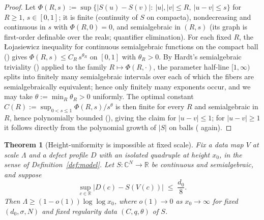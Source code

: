 \documentclass[11pt]{amsart}
\newtheorem{theorem}{Theorem}[section]
\theoremstyle{definition}
\theoremstyle{remark}
\newcommand{\CC}{\mathbb{C}}
\newcommand{\RR}{\mathbb{R}}
\begin{document}
\begin{proof}
Let $\Phi(R,s):=\sup\{|S(u)-S(v)|:\ |u|,|v|\le R,\ |u-v|\le s\}$ for $R\ge1$, $s\in[0,1]$; it is finite (continuity of $S$ on compacta), nondecreasing and continuous in $s$ with $\Phi(R,0)=0$, and semialgebraic in $(R,s)$ (its graph is first-order definable over the reals; quantifier elimination). For each fixed $R$, the \L ojasiewicz inequality for continuous semialgebraic functions on the compact ball (\cite[Prop.~2.6.4]{BCR}) gives $\Phi(R,s)\le C_R\,s^{\theta_R}$ on $[0,1]$ with $\theta_R>0$. By Hardt's semialgebraic triviality (\cite[Thm.~9.3.2]{BCR}) applied to the family $R\mapsto\Phi(R,\cdot)$, the parameter half-line $[1,\infty)$ splits into finitely many semialgebraic intervals over each of which the fibers are semialgebraically equivalent; hence only finitely many exponents occur, and we may take $\theta:=\min_R\theta_R>0$ uniformly. The optimal constant $C(R):=\sup_{0<s\le1}\Phi(R,s)/s^{\theta}$ is then finite for every $R$ and semialgebraic in $R$, hence polynomially bounded (\cite[Prop.~2.6.2]{BCR}), giving the claim for $|u-v|\le1$; for $|u-v|\ge1$ it follows directly from the polynomial growth of $|S|$ on balls (\cite[Prop.~2.6.2]{BCR} again).
\end{proof}

\begin{theorem}[Height-uniformity is impossible at fixed scale]\label{thm:lower}
Fix a data map $V$ at scale $\Lambda$ and a defect profile $D$ with an isolated quadruple at height $x_0$, in the sense of Definition~\ref{def:model}. Let $S:\CC^N\to\RR$ be continuous and semialgebraic, and suppose
\[
\sup_{c\in\RR}\big|D(c)-S(V(c))\big|\;\le\;\frac{d_0}{8}.
\]
Then $\Lambda\ge(1-o(1))\log\log x_0$, where $o(1)\to0$ as $x_0\to\infty$ for fixed $(d_0,\sigma,N)$ and fixed regularity data $(C,q,\theta)$ of $S$.
\end{theorem}
\end{document}
